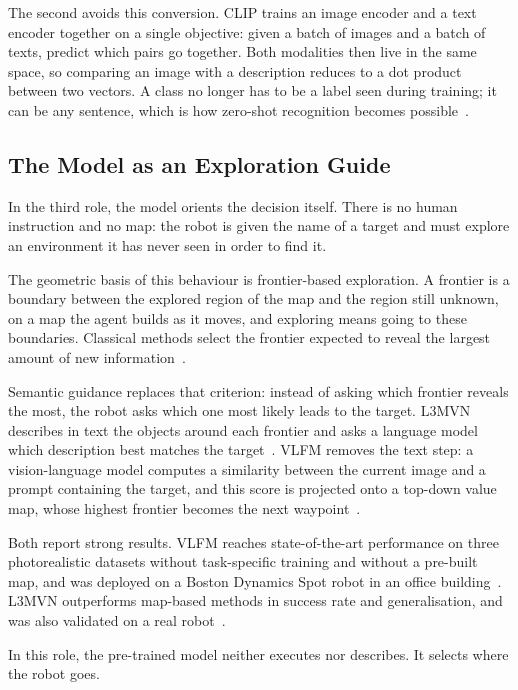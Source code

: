 The second avoids this conversion. CLIP trains an image encoder and a text
encoder together on a single objective: given a batch of images and a batch of
texts, predict which pairs go together. Both modalities then live in the same
space, so comparing an image with a description reduces to a dot product between
two vectors. A class no longer has to be a label seen during training; it can be
any sentence, which is how zero-shot recognition becomes
possible~\cite{radford2021learning}.

\subsection{The Model as an Exploration Guide}%
\label{subsec:nav:genai-navigation}

In the third role, the model orients the decision itself. There is no human
instruction and no map: the robot is given the name of a target and must explore
an environment it has never seen in order to find it.

The geometric basis of this behaviour is frontier-based exploration. A frontier
is a boundary between the explored region of the map and the region still
unknown, on a map the agent builds as it moves, and exploring means going to
these boundaries. Classical methods select the frontier expected to reveal the
largest amount of new information~\cite{yokoyama2024vlfm}.

Semantic guidance replaces that criterion: instead of asking which frontier
reveals the most, the robot asks which one most likely leads to the target. L3MVN
describes in text the objects around each frontier and asks a language model
which description best matches the target~\cite{yu2023l3mvn}. VLFM removes the
text step: a vision-language model computes a similarity between the current
image and a prompt containing the target, and this score is projected onto a
top-down value map, whose highest frontier becomes the next
waypoint~\cite{yokoyama2024vlfm}.

Both report strong results. VLFM reaches state-of-the-art performance on three
photorealistic datasets without task-specific training and without a pre-built
map, and was deployed on a Boston Dynamics Spot robot in an office
building~\cite{yokoyama2024vlfm}. L3MVN outperforms map-based methods in success
rate and generalisation, and was also validated on a real
robot~\cite{yu2023l3mvn}.

In this role, the pre-trained model neither executes nor describes. It selects
where the robot goes.

